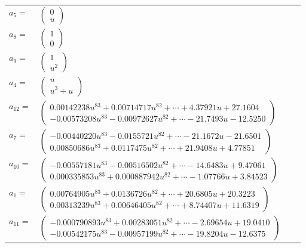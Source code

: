 \documentclass[1p]{elsarticle_modified}
\theoremstyle{definition}
\begin{document}
\begin{tabular}{m{7pt} m{180pt} m{7pt} m{180pt} }
\flushright $a_{5}=$&$\begin{pmatrix}0\\u\end{pmatrix}$ \\
\flushright $a_{8}=$&$\begin{pmatrix}1\\0\end{pmatrix}$ \\
\flushright $a_{9}=$&$\begin{pmatrix}1\\u^2\end{pmatrix}$ \\
\flushright $a_{4}=$&$\begin{pmatrix}u\\u^3+u\end{pmatrix}$ \\
\flushright $a_{12}=$&$\begin{pmatrix}0.00142238 u^{83}+0.00714717 u^{82}+\cdots+4.37921 u+27.1604\\-0.00573208 u^{83}-0.00972627 u^{82}+\cdots-21.7493 u-12.5250\end{pmatrix}$ \\
\flushright $a_{7}=$&$\begin{pmatrix}-0.00440220 u^{83}-0.0155721 u^{82}+\cdots-21.1672 u-21.6501\\0.00850686 u^{83}+0.0117475 u^{82}+\cdots+21.9408 u+4.77851\end{pmatrix}$ \\
\flushright $a_{10}=$&$\begin{pmatrix}-0.00557181 u^{83}-0.00516502 u^{82}+\cdots-14.6483 u+9.47061\\0.000335853 u^{83}+0.000887942 u^{82}+\cdots-1.07766 u+3.84523\end{pmatrix}$ \\
\flushright $a_{1}=$&$\begin{pmatrix}0.00764905 u^{83}+0.0136726 u^{82}+\cdots+20.6805 u+20.3223\\0.00313239 u^{83}+0.00646405 u^{82}+\cdots+8.74407 u+11.6319\end{pmatrix}$ \\
\flushright $a_{11}=$&$\begin{pmatrix}-0.000790893 u^{83}+0.00283051 u^{82}+\cdots-2.69654 u+19.0410\\-0.00542175 u^{83}-0.00957199 u^{82}+\cdots-19.8204 u-12.6375\end{pmatrix}$ \\

\end{tabular}
\end{document}
